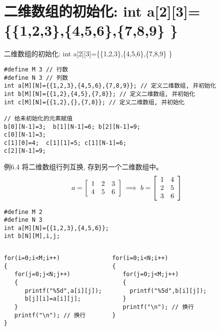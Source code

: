 \section{二维数组的初始化: int a[2][3]=\{\{1,2,3\},\{4,5,6\},\{7,8,9\} \}}

\begin{frame}{二维数组的初始化: int a[2][3]=\{\{1,2,3\},\{4,5,6\},\{7,8,9\} \}}
\begin{lstlisting}
#define M 3 // 行数
#define N 3 // 列数
int a[M][N]={{1,2,3},{4,5,6},{7,8,9}}; // 定义二维数组, 并初始化
int b[M][N]={{1,2},{4,5},{7,8}}; // 定义二维数组, 并初始化
int c[M][N]={{1,2},{},{7,8}}; // 定义二维数组, 并初始化

// 给未初始化的元素赋值
b[0][N-1]=3;  b[1][N-1]=6; b[2][N-1]=9;
c[0][N-1]=3; 
c[1][0]=4;  c[1][1]=5; c[1][N-1]=6; 
c[2][N-1]=9;
\end{lstlisting}
\end{frame}

\begin{frame}{例6.4 将二维数组行列互换, 存到另一个二维数组中。}
\small
\[
a=\left[
\begin{array}[c]{ccc}
1 & 2 & 3\\
4 & 5 & 6
\end{array}
\right]
\implies
b=\left[
\begin{array}[c]{cc}
1 & 4\\
2 & 5\\
3 & 6
\end{array}
\right]
\]
\pause
\begin{lstlisting}
#define M 2 
#define N 3 
int a[M][N]={{1,2,3},{4,5,6}};
int b[N][M],i,j;
\end{lstlisting}
\vspace{-0.4cm}
\begin{columns}[T]
\pause
\begin{lstlisting}
for(i=0;i<M;i++) 
{
   for(j=0;j<N;j++) 
   {
      printf("%5d",a[i][j]);
      b[j][i]=a[i][j]; 
   }
   printf("\n"); // 换行
}
\end{lstlisting}
\pause
\begin{lstlisting}[frame=leftline]
for(i=0;i<N;i++) 
{
   for(j=0;j<M;j++) 
   {
     printf("%5d",b[i][j]); 
   }
   printf("\n"); // 换行
}
\end{lstlisting}
\end{columns}
\vspace{0.001cm}
\end{frame}

